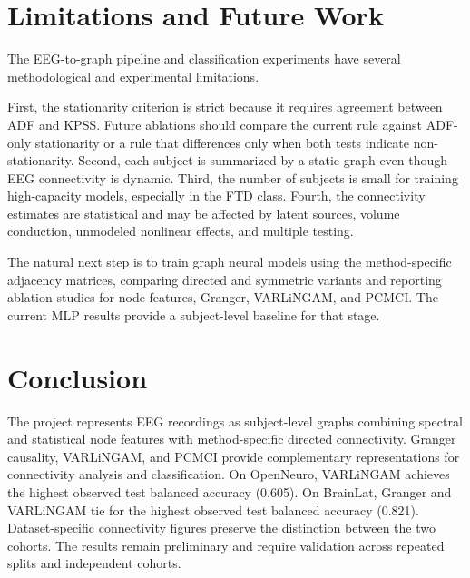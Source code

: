 \documentclass[11pt,a4paper]{article}
\begin{document}
\section{Limitations and Future Work}

The EEG-to-graph pipeline and classification experiments have several
methodological and experimental limitations.

First, the stationarity criterion is strict because it requires agreement
between ADF and KPSS. Future ablations should compare the current rule against
ADF-only stationarity or a rule that differences only when both tests indicate
non-stationarity. Second, each subject is summarized by a static graph even
though EEG connectivity is dynamic. Third, the number of subjects is small for
training high-capacity models, especially in the FTD class. Fourth, the
connectivity estimates are statistical and may be affected by latent sources,
volume conduction, unmodeled nonlinear effects, and multiple testing.

The natural next step is to train graph neural models using the method-specific
adjacency matrices, comparing directed and symmetric variants and reporting
ablation studies for node features, Granger, VARLiNGAM, and PCMCI. The current
MLP results provide a subject-level baseline for that stage.

\section{Conclusion}

The project represents EEG recordings as subject-level graphs combining
spectral and statistical node features with method-specific directed
connectivity. Granger causality, VARLiNGAM, and PCMCI provide complementary
representations for connectivity analysis and classification.
On OpenNeuro, VARLiNGAM achieves the highest observed test balanced accuracy (0.605).
On BrainLat, Granger and VARLiNGAM tie for the highest observed test balanced accuracy (0.821).
Dataset-specific connectivity figures preserve the distinction
between the two cohorts. The results remain preliminary and require
validation across repeated splits and independent cohorts.
\end{document}
